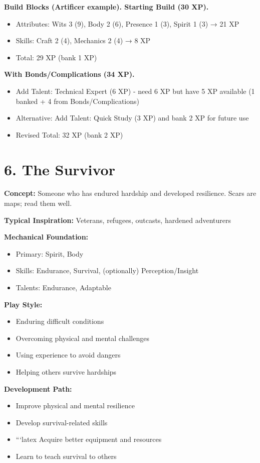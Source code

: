 \documentclass[11pt,twoside,openany]{book}
\begin{document}
\textbf{Build Blocks (Artificer example). Starting Build (30 XP).}
\begin{itemize}
\item Attributes: Wits 3 (9), Body 2 (6), Presence 1 (3), Spirit 1 (3) → 21 XP
\item Skills: Craft 2 (4), Mechanics 2 (4) → 8 XP
\item Total: 29 XP (bank 1 XP)
\end{itemize}

\textbf{With Bonds/Complications (34 XP).}
\begin{itemize}
\item Add Talent: Technical Expert (6 XP) - need 6 XP but have 5 XP available (1 banked + 4 from Bonds/Complications)
\item Alternative: Add Talent: Quick Study (3 XP) and bank 2 XP for future use
\item Revised Total: 32 XP (bank 2 XP)
\end{itemize}

\section*{6. The Survivor} 

\textbf{Concept:} Someone who has endured hardship and developed resilience. Scars are maps; read them well.

\textbf{Typical Inspiration:} Veterans, refugees, outcasts, hardened adventurers

\textbf{Mechanical Foundation:}
\begin{itemize}
\item Primary: Spirit, Body
\item Skills: Endurance, Survival, (optionally) Perception/Insight
\item Talents: Endurance, Adaptable
\end{itemize}

\textbf{Play Style:}
\begin{itemize}
\item Enduring difficult conditions
\item Overcoming physical and mental challenges
\item Using experience to avoid dangers
\item Helping others survive hardships
\end{itemize}

\textbf{Development Path:}
\begin{itemize}
\item Improve physical and mental resilience
\item Develop survival-related skills
\item
```latex
Acquire better equipment and resources
\item Learn to teach survival to others
\end{itemize}
\end{document}
